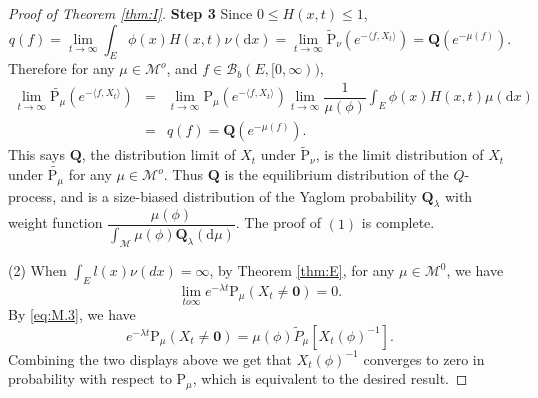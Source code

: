 \documentclass[12pt,a4paper]{amsart}
\numberwithin{equation}{section}
\theoremstyle{plain}
\theoremstyle{definition}
\theoremstyle{remark}
\begin{document}
\begin{proof}[Proof of Theorem \ref{thm:I}]
{\bf Step 3}\quad
Since $0\leq H(x,t)\leq 1$,
\begin{equation*}
q(f)
=\lim_{t\rightarrow\infty}\int_E\phi(x)H(x,t)\nu(\mathrm dx)
=\lim_{t\rightarrow\infty}\widetilde{\mathrm P}_{\nu}\left(e^{-\langle f, X_t\rangle }\right)
=\mathbf Q(e^{-\mu(f)}).
\end{equation*}
Therefore for any $\mu\in\mathcal M^o$, and $f\in\mathcal B_b(E,[0,\infty))$,
\begin{eqnarray*}
\lim_{t\rightarrow\infty}\widetilde{\mathrm P_\mu}\left(e^{-\langle f, X_t\rangle}\right)&=&\lim_{t\rightarrow\infty}\mathrm P_\mu\left(e^{-\langle f, X_t\rangle}\right)
\lim_{t\to\infty}\dfrac{1}{\mu(\phi)}\int_E\phi(x)H(x, t)\mu(\mathrm dx)\\
&=&q(f)=\mathbf Q(e^{-\mu(f)}).
\end{eqnarray*}
This says $\mathbf Q$, the distribution limit of $X_t$ under $\widetilde{\mathrm P}_{\nu}$, is the  limit distribution of  $X_t$ under $\widetilde{\mathrm P_\mu}$ for any $\mu\in{\mathcal M}^o$. Thus $\mathbf Q$ is the
equilibrium distribution of the $Q$-process, and is a size-biased distribution of the Yaglom probability $\mathbf Q_\lambda$ with weight function $\dfrac{\mu(\phi)}{\int_{{\mathcal M}}\mu(\phi)\mathbf Q_\lambda(\mathrm d\mu)}$.  The proof of $(1)$ is complete.



(2) When $\int_El(x)\nu(dx)=\infty$,
by Theorem \ref{thm:E}, for any $\mu\in \mathcal M^0$, we have
$$
\lim_{to\infty}e^{-\lambda t}\mathrm P_\mu(X_t\neq\mathbf 0)=0.
$$
By \eqref{eq:M.3}, we have
$$
e^{-\lambda t}\mathrm P_\mu(X_t\neq\mathbf 0)=\mu(\phi)\widetilde{P}_\mu[X_t(\phi)^{-1}].
$$
Combining the two displays above we get that $X_t(\phi)^{-1}$ converges to zero in probability
with respect to $\mathrm P_\mu$, which is equivalent to the desired result.
\end{proof}

\appendix
\section{}
\end{document}
